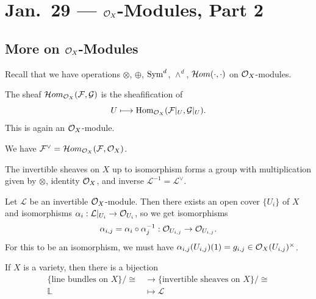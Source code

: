 \chapter{Jan.~29 --- \texorpdfstring{$\mathcal{O}_X$}{OX}-Modules, Part 2}

\section{More on \texorpdfstring{$\mathcal{O}_X$}{OX}-Modules}

\begin{remark}
  Recall that we have operations
  $\otimes$, $\oplus$,
  $\operatorname{Sym}^d$, $\wedge^d$,
  $\mathcal{H}om(\cdot, \cdot)$ on
  $\mathcal{O}_X$-modules.
\end{remark}

\begin{example}
  The sheaf $\mathcal{H}om_{\mathcal{O}_X}(\mathcal{F}, \mathcal{G})$
  is the sheafification of
  \[
    U \longmapsto
    \operatorname{Hom}_{\mathcal{O}_X}(\mathcal{F}|_U, \mathcal{G}|_U).
  \]
  This is again an $\mathcal{O}_X$-module.
\end{example}

\begin{example}
  We have $\mathcal{F}^\vee = \mathcal{H}om_{\mathcal{O}_X}(\mathcal{F}, \mathcal{O}_X)$.
\end{example}

\begin{exercise}
  The invertible sheaves on $X$
  up to isomorphism forms a group
  with multiplication given by
  $\otimes$, identity $\mathcal{O}_X$,
  and inverse
  $\mathcal{L}^{-1} = \mathcal{L}^\vee$.
\end{exercise}

\begin{remark}
  Let $\mathcal{L}$ be an invertible
  $\mathcal{O}_X$-module. Then there exists an
  open cover $\{U_i\}$ of $X$ and
  isomorphisms
  $\alpha_i : \mathcal{L}|_{U_i} \to \mathcal{O}_{U_i}$,
  so we get isomorphisms
  \[
    \alpha_{i, j}
    = \alpha_i \circ \alpha_j^{-1}
    : \mathcal{O}_{U_{i, j}}
    \to \mathcal{O}_{U_{i, j}}.
  \]
  For this to be an isomorphism,
  we must have
  $\alpha_{i, j}(U_{i, j})(1) = g_{i, j} \in \mathcal{O}_X(U_{i, j})^\times$.
\end{remark}

\begin{prop}
  If $X$ is a variety, then there is a
  bijection
  \begin{align*}
    \{\text{line bundles on } X\} / {\cong}
    &\longrightarrow
    \{
      \text{invertible sheaves on } X
    \} / {\cong} \\
    \mathbb{L} &\longmapsto \mathcal{L}
  \end{align*}
\end{prop}


